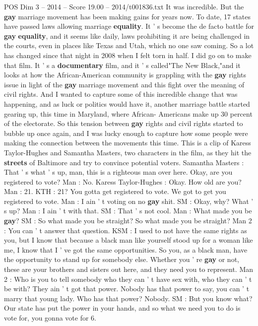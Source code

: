 \begin{textsample}{POS Dim 3 – 2014 – Score 19.00 – 2014/t001836.txt}
It was incredible.
But the \textbf{gay} marriage movement has been making gains for years now.
To date, 17 states have passed laws allowing marriage \textbf{equality}.
It ' s become the de facto battle for \textbf{gay} \textbf{equality}, and it seems like daily, laws prohibiting it are being challenged in the courts, even in places like Texas and Utah, which no one saw coming.
So a lot has changed since that night in 2008 when I felt torn in half.
I did go on to make that film.
It ' s a \textbf{documentary} film, and it ' s called"The New Black,"and it looks at how the African-American community is grappling with the \textbf{gay} rights issue in light of the \textbf{gay} marriage movement and this fight over the meaning of civil rights.
And I wanted to capture some of this incredible change that was happening, and as luck or politics would have it, another marriage battle started gearing up, this time in Maryland, where African- Americans make up 30 percent of the electorate.
So this tension between \textbf{gay} rights and civil rights started to bubble up once again, and I was lucky enough to capture how some people were making the connection between the movements this time.
This is a clip of Karess Taylor-Hughes and Samantha Masters, two characters in the film, as they hit the \textbf{streets} of Baltimore and try to convince potential voters.
Samantha Masters : That ' s what ' s up, man, this is a righteous man over here.
Okay, are you registered to vote?
Man : No.
Karess Taylor-Hughes : Okay.
How old are you?
Man : 21.
KTH : 21?
You gotta get registered to vote.
We got to get you registered to vote.
Man : I ain ' t voting on no \textbf{gay} shit.
SM : Okay, why?
What ' s up?
Man : I ain ' t with that.
SM : That ' s not cool.
Man : What made you be \textbf{gay}?
SM : So what made you be straight?
So what made you be straight?
Man 2 : You can ' t answer that question.
KSM : I used to not have the same rights as you, but I know that because a black man like yourself stood up for a woman like me, I know that I ' ve got the same opportunities.
So you, as a black man, have the opportunity to stand up for somebody else.
Whether you ' re \textbf{gay} or not, these are your brothers and sisters out here, and they need you to represent.
Man 2 : Who is you to tell somebody who they can ' t have sex with, who they can ' t be with?
They ain ' t got that power.
Nobody has that power to say, you can ' t marry that young lady.
Who has that power?
Nobody.
SM : But you know what?
Our state has put the power in your hands, and so what we need you to do is vote for, you gonna vote for 6.

\end{textsample}

